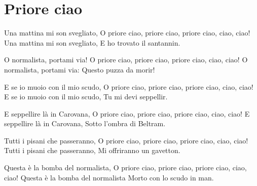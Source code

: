 \section{Priore ciao}
\subtitle{Sulla melodia di “Bella ciao“}
\begin{canzone}
Una mattina mi son svegliato,
O priore ciao, priore ciao, priore ciao, ciao, ciao!
Una mattina mi son svegliato,
E ho trovato il santannin.

O normalista, portami via!
O priore ciao, priore ciao, priore ciao, ciao, ciao!
O normalista, portami via:
Questo puzza da morir!

E se io muoio con il mio scudo,
O priore ciao, priore ciao, priore ciao, ciao, ciao!
E se io muoio con il mio scudo,
Tu mi devi seppellir.

E seppellire là in Carovana,
O priore ciao, priore ciao, priore ciao, ciao, ciao!
E seppellire là in Carovana,
Sotto l’ombra di Beltram.

Tutti i pisani che passeranno,
O priore ciao, priore ciao, priore ciao, ciao, ciao!
Tutti i pisani che passeranno,
Mi offriranno un gavetton.

Questa è la bomba del normalista,
O priore ciao, priore ciao, priore ciao, ciao, ciao!
Questa è la bomba del normalista
Morto con lo scudo in man.
\end{canzone}
